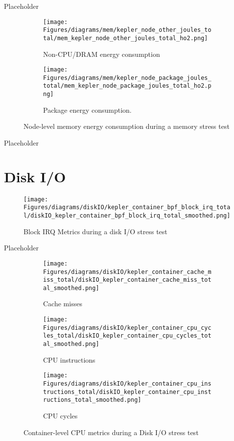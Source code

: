 Placeholder

\begin{figure}[H]
    \centering
    \begin{subfigure}{0.49\textwidth}
        \texttt{[image: Figures/diagrams/mem/kepler\_node\_other\_joules\_total/mem\_kepler\_node\_other\_joules\_total\_ho2.png]}
        \caption{Non-CPU/DRAM energy consumption}
    \end{subfigure}
    \begin{subfigure}{0.49\textwidth}
        \texttt{[image: Figures/diagrams/mem/kepler\_node\_package\_joules\_total/mem\_kepler\_node\_package\_joules\_total\_ho2.png]}
        \caption{Package energy consumption.}
    \end{subfigure}
    \caption{Node-level memory energy consumption during a memory stress test}
\end{figure}

Placeholder

\section{Disk I/O}

\begin{figure}[H]
    \centering
    \texttt{[image: Figures/diagrams/diskIO/kepler\_container\_bpf\_block\_irq\_total/diskIO\_kepler\_container\_bpf\_block\_irq\_total\_smoothed.png]}
    \caption{Block IRQ Metrics during a disk I/O stress test}
\end{figure}

Placeholder

\begin{figure}[H]
    \centering
    \begin{subfigure}{1\textwidth}
        \texttt{[image: Figures/diagrams/diskIO/kepler\_container\_cache\_miss\_total/diskIO\_kepler\_container\_cache\_miss\_total\_smoothed.png]}
        \caption{Cache misses}
    \end{subfigure}
    \begin{subfigure}{0.49\textwidth}
        \texttt{[image: Figures/diagrams/diskIO/kepler\_container\_cpu\_cycles\_total/diskIO\_kepler\_container\_cpu\_cycles\_total\_smoothed.png]}
        \caption{CPU instructions}
    \end{subfigure}
    \begin{subfigure}{0.49\textwidth}
        \texttt{[image: Figures/diagrams/diskIO/kepler\_container\_cpu\_instructions\_total/diskIO\_kepler\_container\_cpu\_instructions\_total\_smoothed.png]}
        \caption{CPU cycles}
    \end{subfigure}
    \caption{Container-level CPU metrics during a Disk I/O stress test}
\end{figure}


